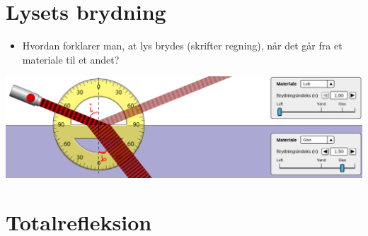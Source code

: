 \documentclass[a4paper, 12pt]{article}
\begin{document}
\vfill
\newpage

\section*{Lysets brydning}
\label{sec:orgb8fbfad}
\begin{minipage}{0.3\linewidth}
\begin{itemize}
\item Hvordan forklarer man, at lys brydes (skrifter regning), når det går fra et materiale til et andet?
\end{itemize}
\end{minipage}
\vline
\begin{minipage}{0.68\linewidth}
\begin{center}
\includegraphics[width=.9\linewidth]{./img/laser_luft_glas_i_og_b.png}
\end{center}
\end{minipage}

\vfill

\section*{Totalrefleksion}
\label{sec:orgb7e12b1}
\end{document}

